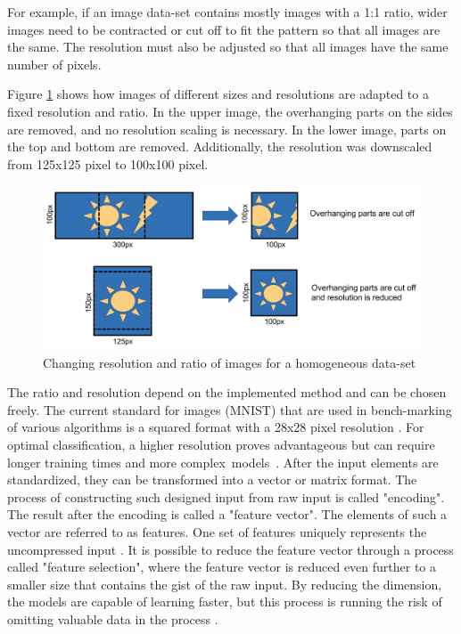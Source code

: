 For example, if an image data-set contains mostly images with a 1:1 ratio, wider images need to be contracted or cut off to fit the pattern so that all images are the same. The resolution must also be adjusted so that all images have the same number of pixels.

Figure \ref{fig:pixel} shows how images of different sizes and resolutions are adapted to a fixed resolution and ratio. In the upper image, the overhanging parts on the sides are removed, and no resolution scaling is necessary. In the lower image, parts on the top and bottom are removed. Additionally, the resolution was downscaled from 125x125 pixel to 100x100 pixel. 

\begin{figure}[H]
	\centering
	\includegraphics[width=1\linewidth]{IMGs/pixel.png}
	\caption{Changing resolution and ratio of images for a homogeneous data-set}
	\label{fig:pixel}
\end{figure}
\newpage
The ratio and resolution depend on the implemented method and can be chosen freely. 
The current standard for images (MNIST) that are used in bench-marking of various algorithms is a squared format with a 28x28 pixel resolution \cite{Baldominos}. For optimal classification, a higher resolution proves advantageous but can require longer training times and more complex~models~\cite{Kannojia,Huang}. After the input elements are standardized, they can be transformed into a vector or matrix format. The process of constructing such designed input from raw input is called "encoding". The result after the encoding is called a "feature vector". The elements of such a vector are referred to as features. One set of features uniquely represents the uncompressed input \cite{Theodoridis}. It is possible to reduce the feature vector through a process called "feature selection", where the feature vector is reduced even further to a smaller size that contains the gist of the raw input. By reducing the dimension, the models are capable of learning faster, but this process is running the risk of omitting valuable data in the process \cite{Janiesch}.

